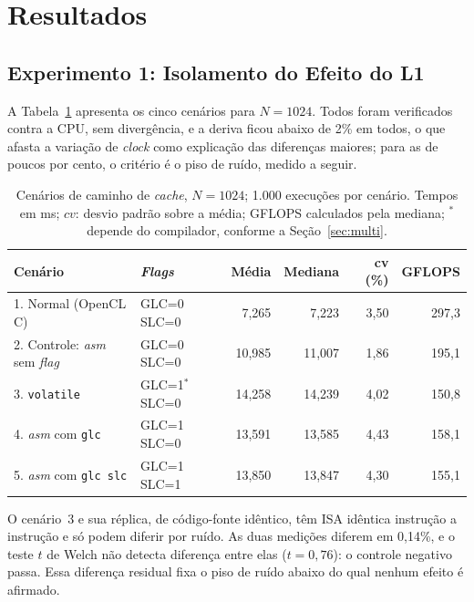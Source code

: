 \documentclass[12pt]{article}
\begin{document}
\section{Resultados}
\label{sec:resultados}

\subsection{Experimento 1: Isolamento do Efeito do L1}
\label{sec:fatorial}

A Tabela~\ref{tab:cenarios} apresenta os cinco cenários para $N=1024$. Todos foram verificados contra a CPU, sem divergência, e a deriva ficou abaixo de 2\% em todos, o que afasta a variação de \textit{clock} como explicação das diferenças maiores; para as de poucos por cento, o critério é o piso de ruído, medido a seguir.

\begin{table}[ht]
\centering
\caption{Cenários de caminho de \textit{cache}, $N=1024$; 1.000 execuções por cenário. Tempos em ms; $cv$: desvio padrão sobre a média; GFLOPS calculados pela mediana; $^\ast$depende do compilador, conforme a Seção~\ref{sec:multi}.}
\label{tab:cenarios}
\footnotesize
\begin{tabular}{@{}llrrrr@{}}
\toprule
\textbf{Cenário} & \textbf{\textit{Flags}} & \textbf{Média} & \textbf{Mediana} & \textbf{cv (\%)} & \textbf{GFLOPS} \\
\midrule
1. Normal (OpenCL C) & GLC=0 SLC=0 & 7,265 & 7,223 & 3,50 & 297,3 \\
2. Controle: \textit{asm} sem \textit{flag} & GLC=0 SLC=0 & 10,985 & 11,007 & 1,86 & 195,1 \\
3. \texttt{volatile} & GLC=1$^\ast$ SLC=0 & 14,258 & 14,239 & 4,02 & 150,8 \\
4. \textit{asm} com \texttt{glc} & GLC=1 SLC=0 & 13,591 & 13,585 & 4,43 & 158,1 \\
5. \textit{asm} com \texttt{glc slc} & GLC=1 SLC=1 & 13,850 & 13,847 & 4,30 & 155,1 \\
\bottomrule
\end{tabular}
\end{table}

O cenário~3 e sua réplica, de código-fonte idêntico, têm ISA idêntica instrução a instrução e só podem diferir por ruído. As duas medições diferem em 0,14\%, e o teste $t$ de Welch não detecta diferença entre elas ($t=0{,}76$): o controle negativo passa. Essa diferença residual fixa o piso de ruído abaixo do qual nenhum efeito é afirmado.
\end{document}
